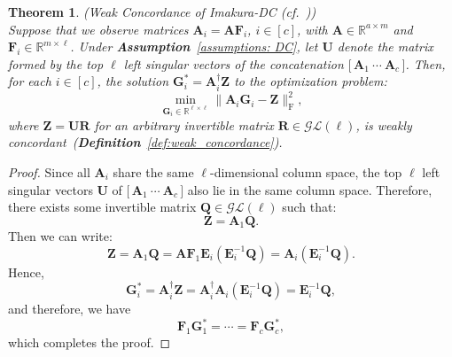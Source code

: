 \documentclass[final,3p,times]{elsarticle}
\theoremstyle{plain}
\newtheorem{theorem}{Theorem}[section]
\newcommand{\matr}[1]{\bm{#1}}        %
\begin{document}
\begin{theorem}

    \label{theorem: Imakura concordance}
    (Weak Concordance of Imakura-DC (cf.~\cite{DCprivacy}))\\
    Suppose that we observe matrices \(\matr{A}_i = \matr{A}\matr{F}_i\), \( i \in [c] \), with \(\matr{A}\in \mathbb{R}^{a\times m}\) and \(\matr{F}_i\in\mathbb{R}^{m\times \ell}\). Under \textbf{Assumption}~\ref{assumptions: DC}, let \(\matr{U}\) denote the matrix formed by the top \(\ell\) left singular vectors of the concatenation $\big[\,\matr{A}_1~\cdots~\matr{A}_c\,\big]$.  
    Then, for each \(i \in [c]\), the solution \(\matr{G}_i^* = \matr{A}_i^\dagger \matr{Z}\) to the optimization problem:
    \begin{equation}
        \label{eq:DC_Gi_repeated}
        \min_{\matr{G}_i \in \mathbb{R}^{\ell\times \ell}} \|\matr{A}_i\matr{G}_i - \matr{Z}\|_\mathrm{F}^2,
    \end{equation}
    where \(\matr{Z}=\matr{U}\matr{R}\) for an arbitrary invertible matrix \(\matr{R}\in\mathcal{GL}({\ell})\), is weakly concordant~(\textbf{Definition}~\ref{def:weak_concordance}).
    
\end{theorem}

\begin{proof}

Since all \(\matr{A}_i\) share the same \(\ell\)-dimensional column space, the top \( \ell \) left singular vectors \( \matr{U} \) of $\big[\,\matr{A}_1~\cdots~\matr{A}_c\,\big]$ also lie in the same column space. Therefore, there exists some invertible matrix \( \matr{Q} \in \mathcal{GL}(\ell)\) such that:
\begin{equation}
\matr{Z} = \matr{A}_1 \matr{Q}.
\end{equation}
Then we can write:
\begin{equation}
\matr{Z} = \matr{A}_1 \matr{Q} = \matr{A} \matr{F}_1 \matr{E}_i (\matr{E}_i^{-1} \matr{Q}) = \matr{A}_i (\matr{E}_i^{-1} \matr{Q}).
\end{equation}
Hence, 
\begin{equation}
\matr{G}_i^* = \matr{A}_i^\dagger \matr{Z} = \matr{A}_i^\dagger \matr{A}_i (\matr{E}_i^{-1} \matr{Q}) = \matr{E}_i^{-1} \matr{Q},
\end{equation}
and therefore, we have
\begin{equation}
\matr{F}_1 \matr{G}_1^* = \cdots = \matr{F}_c \matr{G}_c^*,
\end{equation}
which completes the proof.

\end{proof}
\end{document}
